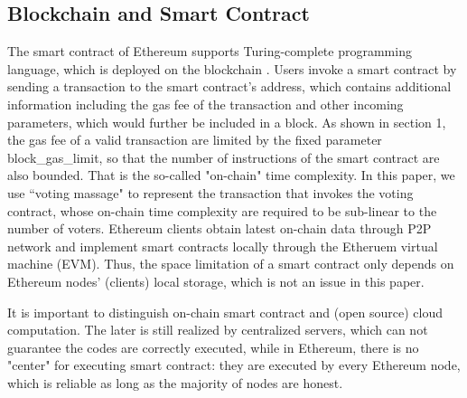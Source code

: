 \subsection{Blockchain and Smart Contract}
The smart contract of Ethereum supports Turing-complete programming language, which is deployed on the blockchain \cite{bocek2018smart}. Users invoke a smart contract by sending a transaction to the smart contract's address, which contains additional information including the gas fee of the transaction and other incoming parameters, which would further be included in a block. As shown in section 1, the gas fee of a valid transaction are limited by the fixed parameter block\_gas\_limit, so that the number of instructions of the smart contract are also bounded. That is the so-called "on-chain" time complexity. In this paper, we use ``voting massage" to represent the transaction that invokes the voting contract, whose on-chain time complexity are required to be sub-linear to the number of voters.  Ethereum clients obtain latest on-chain data through P2P network and implement smart contracts locally through the Etheruem virtual machine (EVM). Thus, the space limitation of a smart contract only depends on Ethereum nodes' (clients) local storage, which is not an issue in this paper.

It is important to distinguish on-chain smart contract and (open source) cloud computation. The later is still realized by centralized servers, which can not guarantee the codes are correctly executed, while in Ethereum, there is no "center" for executing smart contract: they are executed by every Ethereum node, which is reliable as long as the majority of nodes are honest.

